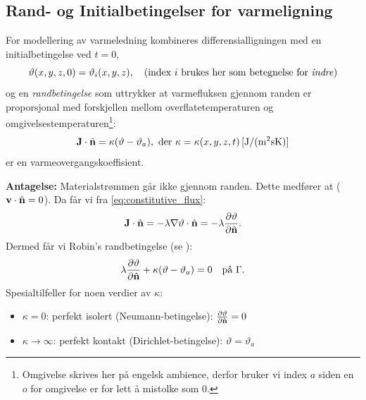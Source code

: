 \subsection*{Rand- og Initialbetingelser for varmeligning}
For modellering av varmeledning kombineres differensialligningen med en initialbetingelse ved \( t = 0 \),
\begin{equation}
\vartheta(x,y,z, 0) = \vartheta_i(x,y,z), \quad (\text{index } i \text{ brukes her som betegnelse for \textit{indre}})
\end{equation}
og en \emph{randbetingelse} som uttrykker at varmefluksen gjennom randen er proporsjonal med forskjellen mellom overflatetemperaturen og omgivelsestemperaturen\footnote{Omgivelse skrives her på engelsk ambience, derfor bruker vi index $a$ siden en $o$ for omgivelse er for lett å mistolke som $0$.}:
\[
\mathbf{J} \cdot \hat{\mathbf{n}} = \kappa(\vartheta - \vartheta_a), \text{ der } \kappa = \kappa(x,y,z, t) \, [\mathrm{J/(m^2 s K)}]  
\]
er en varmeovergangskoeffisient. 

\textbf{Antagelse:} Materialstrømmen går ikke gjennom randen. Dette medfører at  (\( \mathbf{v} \cdot \hat{\mathbf{n}} = 0 \)). Da får vi fra \eqref{eq:constitutive_flux}:
\[
\mathbf{J} \cdot \hat{\mathbf{n}} = -\lambda \nabla \vartheta \cdot \hat{\mathbf{n}} = -\lambda \frac{\partial \vartheta}{\partial \hat{\mathbf{n}}}.
\]
Dermed får vi Robin's randbetingelse (se ):
\begin{equation} \label{varme:rand}
\lambda \frac{\partial \vartheta}{\partial \hat{\mathbf{n}}} + \kappa(\vartheta - \vartheta_a) = 0 \quad \text{på } \Gamma.
\end{equation}
Spesialtilfeller for noen verdier av $\kappa$:
\begin{itemize}
\item \( \kappa = 0 \): perfekt isolert (Neumann-betingelse): \( \frac{\partial \vartheta}{\partial \hat{\mathbf{n}}} = 0 \)
\item \( \kappa \to \infty \): perfekt kontakt (Dirichlet-betingelse): \( \vartheta = \vartheta_a \)
\end{itemize}

